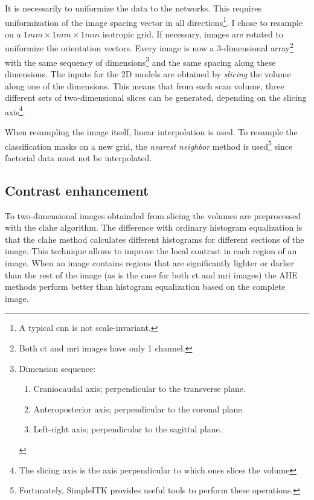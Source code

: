 It is necessarily to uniformize the data to the networks. 
This requires uniformization of the image spacing vector in all directions\footnote{A typical \acrshort{cnn} is not scale-invariant.}. 
I chose to resample on a $1mm\times 1mm \times 1mm$ isotropic grid. 
If necessary, images are rotated to uniformize the orientation vectors. 
Every image is now a 3-dimensional array\footnote{Both \acrshort{ct} and \acrshort{mri} images have only 1 channel.} with the same sequency of dimensions\footnote{Dimension sequence:
\begin{enumerate}
    \item Craniocaudal axis; perpendicular to the transverse plane.
    \item Anteroposterior axis; perpendicular to the coronal plane.
    \item Left-right axis; perpendicular to the sagittal plane.
\end{enumerate}
} and the same spacing along these dimensions.
The inputs for the 2D models are obtained by \textit{slicing} the volume along one of the dimensions.
This means that from each scan volume, three different sets of two-dimensional slices can be generated, depending on the slicing axis\footnote{The slicing axis is the axis perpendicular to which ones slices the volume}.



When resampling the image itself, linear interpolation is used. 
To resample the classification masks on a new grid, the \textit{nearest neighbor} method is used\footnote{Fortunately, SimpleITK \cite{sitk} provides useful tools to perform these operations.} since factorial data must not be interpolated. 

\subsection{Contrast enhancement}
To two-dimensional images obtainded from slicing the volumes are preprocessed with the \acrfull{clahe} algorithm. 
The difference with ordinary histogram equalization is that the \acrshort{clahe} method calculates different histograms for different sections of the image.
This technique allows to improve the local contrast in each region of an image.
When an image contains regions that are significantly lighter or darker than the rest of the image (as is the case for both \acrshort{ct} and \acrshort{mri} images) the AHE methods perform better than histogram equalization based on the complete image.

